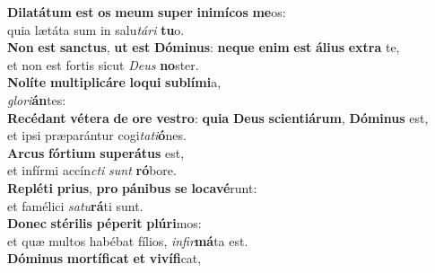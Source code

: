 \evenverse \textbf{Di}\textbf{la}\textbf{tá}\textbf{tum} \textbf{est} \textbf{os} \textbf{me}\textbf{um} \textbf{su}\textbf{per} \textbf{i}\textbf{ni}\textbf{mí}\textbf{cos} \textbf{me}os:~\*\\
\evenverse quia lætáta sum in salu\textit{tá}\textit{ri} \textbf{tu}o.\\
\oddverse \textbf{Non} \textbf{est} \textbf{san}\textbf{ctus}, \textbf{ut} \textbf{est} \textbf{Dó}\textbf{mi}\textbf{nus}: \textbf{ne}\textbf{que} \textbf{e}\textbf{nim} \textbf{est} \textbf{á}\textbf{li}\textbf{us} \textbf{ex}\textbf{tra} te,~\*\\
\oddverse et non est fortis sicut \textit{De}\textit{us} \textbf{no}ster.\\
\evenverse \textbf{No}\textbf{lí}\textbf{te} \textbf{mul}\textbf{ti}\textbf{pli}\textbf{cá}\textbf{re} \textbf{lo}\textbf{qui} \textbf{su}\textbf{blí}\textbf{mi}a,~\*\\
\evenverse \textit{glo}\textit{ri}\textbf{án}tes:\\
\oddverse \textbf{Re}\textbf{cé}\textbf{dant} \textbf{vé}\textbf{te}\textbf{ra} \textbf{de} \textbf{o}\textbf{re} \textbf{ve}\textbf{stro}: \textbf{qui}\textbf{a} \textbf{De}\textbf{us} \textbf{sci}\textbf{en}\textbf{ti}\textbf{á}\textbf{rum}, \textbf{Dó}\textbf{mi}\textbf{nus} est,~\*\\
\oddverse et ipsi præparántur cogi\textit{ta}\textit{ti}\textbf{ó}nes.\\
\evenverse \textbf{Ar}\textbf{cus} \textbf{fór}\textbf{ti}\textbf{um} \textbf{su}\textbf{pe}\textbf{rá}\textbf{tus} est,~\*\\
\evenverse et infírmi accín\textit{cti} \textit{sunt} \textbf{ró}bore.\\
\oddverse \textbf{Re}\textbf{plé}\textbf{ti} \textbf{pri}\textbf{us}, \textbf{pro} \textbf{pá}\textbf{ni}\textbf{bus} \textbf{se} \textbf{lo}\textbf{ca}\textbf{vé}runt:~\*\\
\oddverse et famélici \textit{sa}\textit{tu}\textbf{rá}ti sunt.\\
\evenverse \textbf{Do}\textbf{nec} \textbf{sté}\textbf{ri}\textbf{lis} \textbf{pé}\textbf{pe}\textbf{rit} \textbf{plú}\textbf{ri}mos:~\*\\
\evenverse et quæ multos habébat fílios, \textit{in}\textit{fir}\textbf{má}ta est.\\
\oddverse \textbf{Dó}\textbf{mi}\textbf{nus} \textbf{mor}\textbf{tí}\textbf{fi}\textbf{cat} \textbf{et} \textbf{vi}\textbf{ví}\textbf{fi}cat,~\*\\

